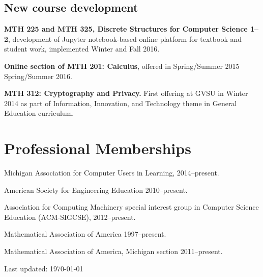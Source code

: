 \documentclass[letterpaper]{article}
\def\footerlink{}
\renewenvironment{itemize}{
  \begin{list}{}{
    \setlength{\leftmargin}{1.5em}
	\setlength{\itemsep}{0in}
  }
}{
  \end{list}
}
\begin{document}
\subsection*{New course development}
\begin{itemize}
	\item \textbf{MTH 225 and MTH 325, Discrete Structures for Computer Science 1--2}, development of Jupyter notebook-based online platform for textbook and student work, implemented Winter and Fall 2016. 
	\item \textbf{Online section of MTH 201: Calculus}, offered in Spring/Summer 2015 Spring/Summer 2016.
	\item \textbf{MTH 312: Cryptography and Privacy. }First offering at GVSU in Winter 2014 as part of Information, Innovation, and Technology theme in General Education curriculum. 
\end{itemize}


\section*{Professional Memberships}
\begin{itemize}
	\item Michigan Association for Computer Users in Learning, 2014--present. 
	\item American Society for Engineering Education 2010--present.
	\item Association for Computing Machinery special interest group in Computer Science Education (ACM-SIGCSE), 2012--present.
	\item Mathematical Association of America 1997--present. 
	\item Mathematical Association of America, Michigan section 2011--present. 
\end{itemize}



\bigskip

\begin{center}
  \begin{footnotesize}
    Last updated: \today \\
  \end{footnotesize}
\end{center}
\end{document}
